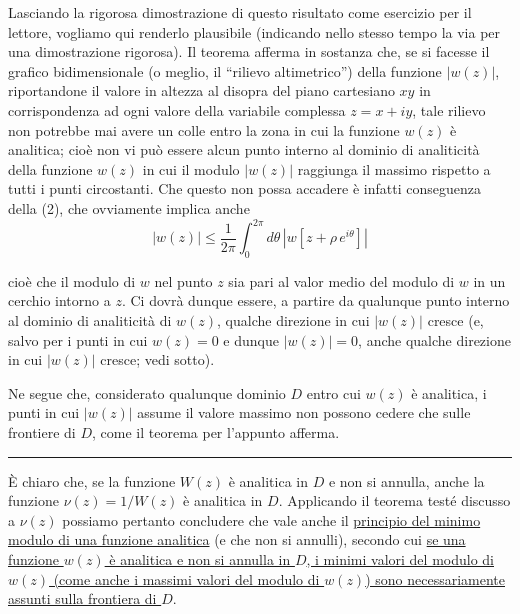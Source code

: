 \documentclass[11pt, a4paper]{book}
\numberwithin{equation}{section}
\begin{document}
Lasciando la rigorosa dimostrazione di questo risultato come esercizio per il lettore, vogliamo qui renderlo plausibile (indicando nello stesso tempo la via per una dimostrazione rigorosa). Il teorema afferma in sostanza che, se si facesse il grafico bidimensionale (o meglio, il ``rilievo altimetrico'') della funzione $|w(z)|$, riportandone il valore in altezza al disopra del piano cartesiano $xy$ in corrispondenza ad ogni valore della variabile complessa $z = x + iy$, tale rilievo non potrebbe mai avere un colle entro la zona in cui la funzione $w(z)$ è analitica; cioè non vi può essere alcun punto interno al dominio di analiticità della funzione $w(z)$ in cui il modulo $|w(z)|$ raggiunga il massimo rispetto a tutti i punti circostanti. Che questo non possa accadere è infatti conseguenza della (2), che ovviamente implica anche
\[
|w(z)| \leq \frac{1}{2\pi} \int_0^{2\pi} d\theta\, \left|w\!\left[z + \rho\, e^{i\theta}\right]\right|
\]


cioè che il modulo di $w$ nel punto $z$ sia pari al valor medio del modulo di $w$ in un cerchio intorno a $z$. Ci dovrà dunque essere, a partire da qualunque punto interno al dominio di analiticità di $w(z)$, qualche direzione in cui $|w(z)|$ cresce (e, salvo per i punti in cui $w(z) = 0$ e dunque $|w(z)| = 0$, anche qualche direzione in cui $|w(z)|$ cresce; vedi sotto).

Ne segue che, considerato qualunque dominio $D$ entro cui $w(z)$ è analitica, i punti in cui $|w(z)|$ assume il valore massimo non possono cedere che sulle frontiere di $D$, come il teorema per l'appunto afferma.

\medskip\hrule\medskip

È chiaro che, se la funzione $W(z)$ è analitica in $D$ e non si annulla, anche la funzione $\nu(z) = 1/W(z)$ è analitica in $D$. Applicando il teorema testé discusso a $\nu(z)$ possiamo pertanto concludere che vale anche il \underline{principio del minimo modulo di una funzione analitica} (e che non si annulli), secondo cui \underline{se una funzione $w(z)$ è analitica e non si annulla in $D$, i minimi valori del modulo di $w(z)$ (come anche i massimi valori del modulo di $w(z)$) sono necessariamente assunti sulla frontiera di $D$}.
\end{document}
